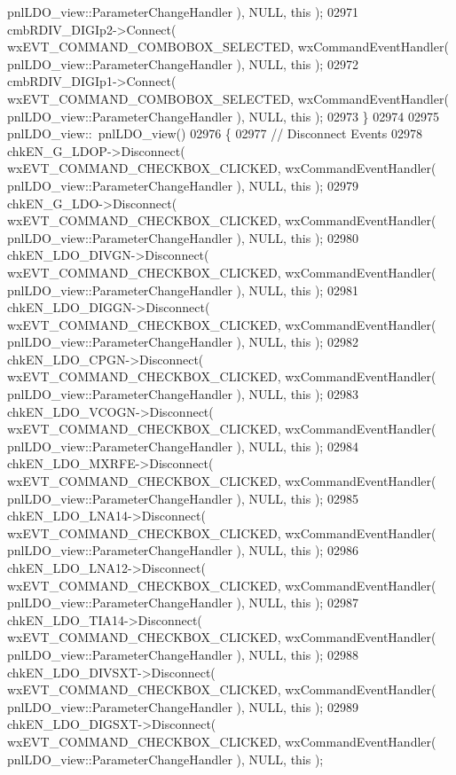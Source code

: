 \begin{DoxyCode}
      pnlLDO_view::ParameterChangeHandler ), NULL, \textcolor{keyword}{this} );
02971     cmbRDIV_DIGIp2->Connect( wxEVT\_COMMAND\_COMBOBOX\_SELECTED, wxCommandEventHandler( 
      pnlLDO_view::ParameterChangeHandler ), NULL, \textcolor{keyword}{this} );
02972     cmbRDIV_DIGIp1->Connect( wxEVT\_COMMAND\_COMBOBOX\_SELECTED, wxCommandEventHandler( 
      pnlLDO_view::ParameterChangeHandler ), NULL, \textcolor{keyword}{this} );
02973 \}
02974 
02975 pnlLDO_view::~pnlLDO_view()
02976 \{
02977     \textcolor{comment}{// Disconnect Events}
02978     chkEN_G_LDOP->Disconnect( wxEVT\_COMMAND\_CHECKBOX\_CLICKED, wxCommandEventHandler( 
      pnlLDO_view::ParameterChangeHandler ), NULL, \textcolor{keyword}{this} );
02979     chkEN_G_LDO->Disconnect( wxEVT\_COMMAND\_CHECKBOX\_CLICKED, wxCommandEventHandler( 
      pnlLDO_view::ParameterChangeHandler ), NULL, \textcolor{keyword}{this} );
02980     chkEN_LDO_DIVGN->Disconnect( wxEVT\_COMMAND\_CHECKBOX\_CLICKED, wxCommandEventHandler( 
      pnlLDO_view::ParameterChangeHandler ), NULL, \textcolor{keyword}{this} );
02981     chkEN_LDO_DIGGN->Disconnect( wxEVT\_COMMAND\_CHECKBOX\_CLICKED, wxCommandEventHandler( 
      pnlLDO_view::ParameterChangeHandler ), NULL, \textcolor{keyword}{this} );
02982     chkEN_LDO_CPGN->Disconnect( wxEVT\_COMMAND\_CHECKBOX\_CLICKED, wxCommandEventHandler( 
      pnlLDO_view::ParameterChangeHandler ), NULL, \textcolor{keyword}{this} );
02983     chkEN_LDO_VCOGN->Disconnect( wxEVT\_COMMAND\_CHECKBOX\_CLICKED, wxCommandEventHandler( 
      pnlLDO_view::ParameterChangeHandler ), NULL, \textcolor{keyword}{this} );
02984     chkEN_LDO_MXRFE->Disconnect( wxEVT\_COMMAND\_CHECKBOX\_CLICKED, wxCommandEventHandler( 
      pnlLDO_view::ParameterChangeHandler ), NULL, \textcolor{keyword}{this} );
02985     chkEN_LDO_LNA14->Disconnect( wxEVT\_COMMAND\_CHECKBOX\_CLICKED, wxCommandEventHandler( 
      pnlLDO_view::ParameterChangeHandler ), NULL, \textcolor{keyword}{this} );
02986     chkEN_LDO_LNA12->Disconnect( wxEVT\_COMMAND\_CHECKBOX\_CLICKED, wxCommandEventHandler( 
      pnlLDO_view::ParameterChangeHandler ), NULL, \textcolor{keyword}{this} );
02987     chkEN_LDO_TIA14->Disconnect( wxEVT\_COMMAND\_CHECKBOX\_CLICKED, wxCommandEventHandler( 
      pnlLDO_view::ParameterChangeHandler ), NULL, \textcolor{keyword}{this} );
02988     chkEN_LDO_DIVSXT->Disconnect( wxEVT\_COMMAND\_CHECKBOX\_CLICKED, wxCommandEventHandler( 
      pnlLDO_view::ParameterChangeHandler ), NULL, \textcolor{keyword}{this} );
02989     chkEN_LDO_DIGSXT->Disconnect( wxEVT\_COMMAND\_CHECKBOX\_CLICKED, wxCommandEventHandler( 
      pnlLDO_view::ParameterChangeHandler ), NULL, \textcolor{keyword}{this} );

\end{DoxyCode}
